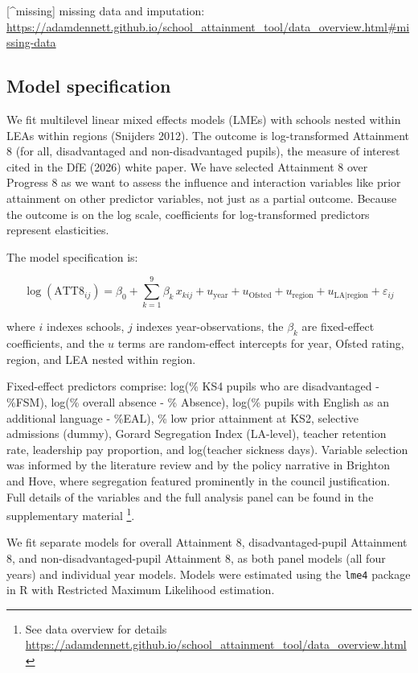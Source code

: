 \documentclass[
  12pt,
  titlepage]{article}
\begin{document}
{[}\^{}missing{]} missing data and imputation:
\url{https://adamdennett.github.io/school_attainment_tool/data_overview.html\#missing-data}

\subsection{Model specification}\label{model-specification}

We fit multilevel linear mixed effects models (LMEs) with schools nested
within LEAs within regions (Snijders 2012). The outcome is
log-transformed Attainment 8 (for all, disadvantaged and
non-disadvantaged pupils), the measure of interest cited in the DfE
(2026) white paper. We have selected Attainment 8 over Progress 8 as we
want to assess the influence and interaction variables like prior
attainment on other predictor variables, not just as a partial outcome.
Because the outcome is on the log scale, coefficients for
log-transformed predictors represent elasticities.

The model specification is:

\[
\log(\text{ATT8}_{ij}) = \beta_0 + \sum_{k=1}^{9} \beta_k \, x_{kij} + u_{\text{year}} + u_{\text{Ofsted}} + u_{\text{region}} + u_{\text{LA|region}} + \varepsilon_{ij}
\]

where \(i\) indexes schools, \(j\) indexes year-observations, the
\(\beta_k\) are fixed-effect coefficients, and the \(u\) terms are
random-effect intercepts for year, Ofsted rating, region, and LEA nested
within region.

Fixed-effect predictors comprise: log(\% KS4 pupils who are
disadvantaged - \%FSM), log(\% overall absence - \% Absence), log(\%
pupils with English as an additional language - \%EAL), \% low prior
attainment at KS2, selective admissions (dummy), Gorard Segregation
Index (LA-level), teacher retention rate, leadership pay proportion, and
log(teacher sickness days). Variable selection was informed by the
literature review and by the policy narrative in Brighton and Hove,
where segregation featured prominently in the council justification.
Full details of the variables and the full analysis panel can be found
in the supplementary material \footnote{See data overview for details
  \url{https://adamdennett.github.io/school_attainment_tool/data_overview.html}}.

We fit separate models for overall Attainment 8, disadvantaged-pupil
Attainment 8, and non-disadvantaged-pupil Attainment 8, as both panel
models (all four years) and individual year models. Models were
estimated using the \texttt{lme4} package in R with Restricted Maximum
Likelihood estimation.
\end{document}
